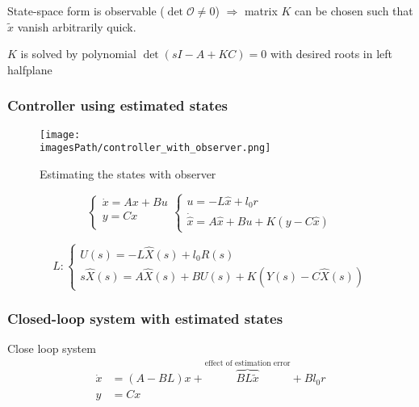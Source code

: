 \documentclass{article}
\newcommand{\imagesPath}{images}
\begin{document}
State-space form is observable ($\det{\mathcal{O}}\neq0$) $\Rightarrow$ matrix $K$ can
be chosen such that $\tilde{x}$ vanish arbitrarily quick.

$K$ is solved by polynomial $\det(sI-A+KC)=0$ with desired roots in left halfplane

\subsubsection{Controller using estimated states}
\begin{figure}[!h]
    \centering
    \texttt{[image: \\imagesPath/controller\_with\_observer.png]}
    \caption{Estimating the states with observer}
\end{figure}

\begin{equation*}
    \begin{cases}
        \dot{x} = Ax + Bu \\
        y = Cx \\
    \end{cases}
    \begin{cases}
       u = -L\hat{x} + l_0r \\
       \dot{\hat{x}} = A\hat{x} + Bu + K(y-C\hat{x})
    \end{cases}
\end{equation*}

\begin{equation*}
    L: 
    \begin{cases}
        U(s) = -L\hat{X}(s) + l_0R(s) \\
        s\hat{X}(s) = A\hat{X}(s) + BU(s) + K(Y(s) - C\hat{X}(s))
    \end{cases}
\end{equation*}

\subsubsection{Closed-loop system with estimated states}
Close loop system
\begin{align*}
    \dot{x} &= (A-BL)x + \overbrace{BL\tilde{x}}^{\text{effect of estimation error}} + Bl_0r \\
    y &= Cx
\end{align*}
\end{document}
